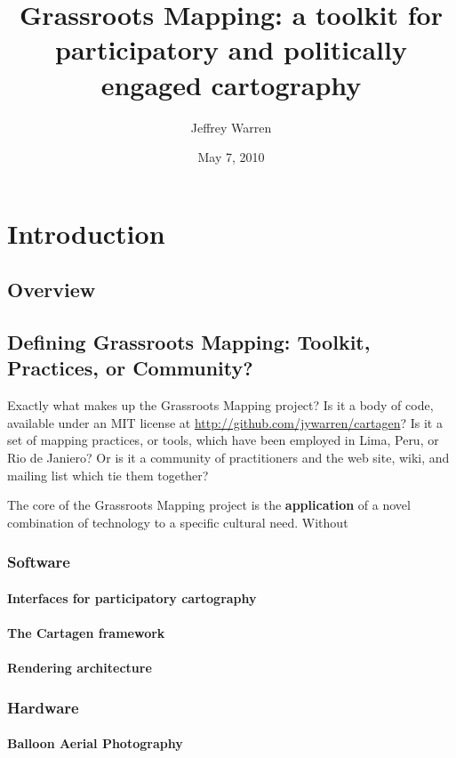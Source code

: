 \documentclass[11pt]{report}
\title{Grassroots Mapping: a toolkit for participatory and politically engaged cartography}
\author{Jeffrey Warren}
\date{May 7, 2010}
\begin{document}
\maketitle

\chapter{Introduction}
\section{Overview}
\section{Defining Grassroots Mapping: Toolkit, Practices, or Community?}

Exactly what makes up the Grassroots Mapping project? Is it a body of code, available under an MIT license at \url{http://github.com/jywarren/cartagen}? Is it a set of mapping practices, or tools, which have been employed in Lima, Peru, or Rio de Janiero? Or is it a community of practitioners and the web site, wiki, and mailing list which tie them together?

The core of the Grassroots Mapping project is the \textbf{application} of a novel combination of technology to a specific cultural need. Without

\subsection{Software}
\subsubsection{Interfaces for participatory cartography}
\subsubsection{The Cartagen framework}
\subsubsection*{Rendering architecture}
\subsection{Hardware}
\subsubsection{Balloon Aerial Photography}
\end{document}
